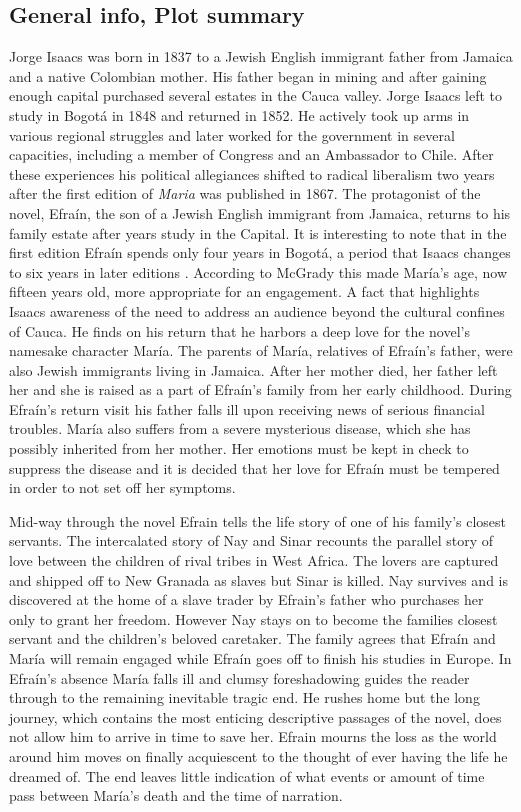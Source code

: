 \documentclass[12pt]{report}\usepackage[]{graphicx}\usepackage[]{color}
\begin{document}
\begin{spacing}{1.9}
\subsection{General info, Plot summary}
Jorge Isaacs was born in 1837 to a Jewish English immigrant father from Jamaica and a native Colombian mother. His father began in mining and after gaining enough capital purchased several estates in the Cauca valley. Jorge Isaacs left to study in Bogotá in 1848 and returned in 1852. He actively took up arms in various regional struggles and later worked for the government in several capacities, including a member of Congress and an Ambassador to Chile. After these experiences his political allegiances shifted to radical liberalism two years after the first edition of \textit{Maria} was published in 1867. 
The protagonist of the novel, Efraín, the son of a Jewish English immigrant from Jamaica, returns to his family estate after years study in the Capital.
It is interesting to note that in the first edition Efraín spends only four years in Bogotá, a period that Isaacs changes to six years in later editions \autocite[67]{Isaacs2012}. According to McGrady this made María's age, now fifteen years old, more appropriate for an engagement. A fact that highlights Isaacs awareness of the need to address an audience beyond the cultural confines of Cauca.
He finds on his return that he harbors a deep love for the novel's namesake character María.
The parents of María, relatives of Efraín's father, were also Jewish immigrants living in Jamaica.
After her mother died, her father left her and she is raised as a part of Efraín's family from her early childhood.
During Efraín's return visit his father falls ill upon receiving news of serious financial troubles.
María also suffers from a severe mysterious disease, which she has possibly inherited from her mother.
Her emotions must be kept in check to suppress the disease and it is decided that her love for Efraín must be tempered in order to not set off her symptoms.


Mid-way through the novel Efrain tells the life story of one of his family’s closest servants.
The intercalated story of Nay and Sinar recounts the parallel story of love between the children of rival tribes in West Africa.
The lovers are captured and shipped off to New Granada as slaves but Sinar is killed.
Nay survives and is discovered at the home of a slave trader by Efrain’s father who purchases her only to grant her freedom.
However Nay stays on to become the families closest servant and the children’s beloved caretaker.
The family agrees that Efraín and María will remain engaged while Efraín goes off to finish his studies in Europe.
In Efraín's absence María falls ill and clumsy foreshadowing guides the reader through to the remaining inevitable tragic end.
He rushes home but the long journey, which contains the most enticing descriptive passages of the novel, does not allow him to arrive in time to save her.
Efrain mourns the loss as the world around him moves on finally acquiescent to the thought of ever having the life he dreamed of.
The end leaves little indication of what events or amount of time pass between María's death and the time of narration.



\end{spacing}
\end{document}
